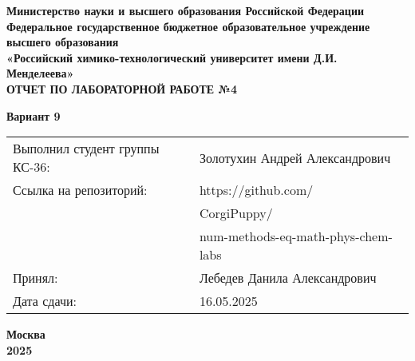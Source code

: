 \documentclass[12pt, a4paper]{report}
\begin{document}
	\begin{titlepage}
		\begin{center}
			\large \textbf{Министерство науки и высшего образования Российской Федерации} \\
			\large \textbf{Федеральное государственное бюджетное образовательное учреждение высшего образования} \\
			\large \textbf{«Российский химико-технологический университет имени Д.И. Менделеева»} \\

			\vspace*{4cm}
			\LARGE \textbf{ОТЧЕТ ПО ЛАБОРАТОРНОЙ РАБОТЕ №4}

			\vspace*{1cm}
			\LARGE \textbf{Вариант 9}

			\vspace*{4cm}
			\begin{flushright}
				\Large
				\begin{tabular}{>{\raggedleft\arraybackslash}p{9cm} p{10cm}}
					Выполнил студент группы КС-36: & Золотухин Андрей Александрович \\
					Ссылка на репозиторий: & https://github.com/ \\
					& CorgiPuppy/ \\
					& num-methods-eq-math-phys-chem-labs \\
					Принял: & Лебедев Данила Александрович \\
					Дата сдачи: & 16.05.2025 \\
				\end{tabular}
			\end{flushright}

			\vspace*{4cm}
			\Large \textbf{Москва \\ 2025}
		\end{center}
	\end{titlepage}

	\tableofcontents
	\thispagestyle{empty}
	\newpage

\end{document}
